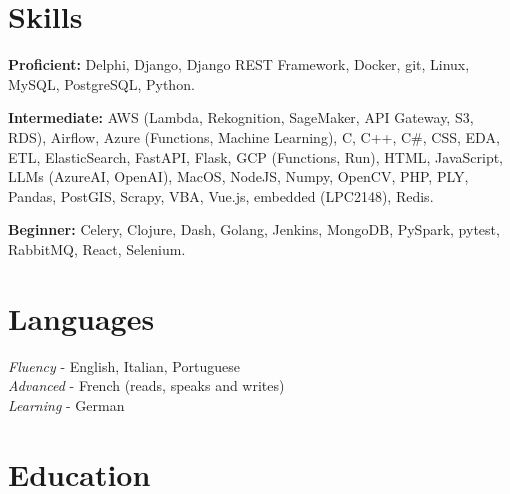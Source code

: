 \documentclass[10pt]{article} %
\begin{document}

\section{Skills}
\rule{0mm}{2mm}\textbf{Proficient:} Delphi, Django, Django REST Framework, Docker, git, Linux, MySQL, PostgreSQL, Python.\\
\rule{0mm}{3mm}\textbf{Intermediate:} AWS (Lambda, Rekognition, SageMaker, API Gateway, S3, RDS), Airflow, Azure (Functions, Machine Learning), C, C++, C\#, CSS, EDA, ETL, ElasticSearch, FastAPI, Flask, GCP (Functions, Run), HTML, JavaScript, LLMs (AzureAI, OpenAI), MacOS, NodeJS, Numpy, OpenCV, PHP, PLY, Pandas, PostGIS, Scrapy, VBA, Vue.js, embedded (LPC2148), Redis.\\
\rule{0mm}{3mm}\textbf{Beginner:} Celery, Clojure, Dash, Golang, Jenkins, MongoDB, PySpark, pytest, RabbitMQ, React, Selenium.


\section{Languages}
{
\textit{Fluency} - English, Italian, Portuguese\\
\textit{Advanced} - French (reads, speaks and writes)\\
\textit{Learning} - German\\
}


\section{Education}

\end{document}
